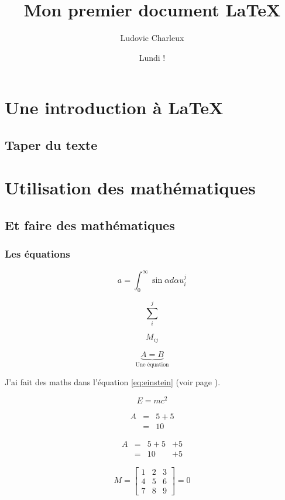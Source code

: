 \documentclass[twoside, twocolumn, a4paper]{book}
\title{Mon premier document \LaTeX}
\author{Ludovic Charleux}
\date{Lundi !}
\begin{document}
 
\maketitle
\tableofcontents
\frontmatter %

\chapter{Une introduction à \LaTeX}
\section{Taper du texte}
\blindtext[10]

\mainmatter %
\chapter{Utilisation des mathématiques}
\section{Et faire des mathématiques}
\subsection{Les équations}

$$
a = \int_0^\infty \sin\alpha d\alpha u_i^j
$$

$$
\sum_i^j
$$

$$
M_{ij}
$$

$$
\underbrace{A = B}_{\mbox{Une équation}}
$$

J'ai fait des maths dans l'équation \ref{eq:einstein} (voir page \pageref{eq:einstein}).

\begin{equation}
E = mc^2
\label{eq:einstein}
\end{equation}

\begin{eqnarray}
A & = & 5 + 5 \nonumber \\
  & = & 10
\end{eqnarray}

\begin{align}
A & = & 5 +  5 & + 5 \\
  & = & 10     & + 5
\end{align}


$$
M = 
\begin{bmatrix}
1 & 2 & 3 \\
4 & 5 & 6 \\
7 & 8 & 9 
\end{bmatrix}
 = 0
$$
\end{document}
